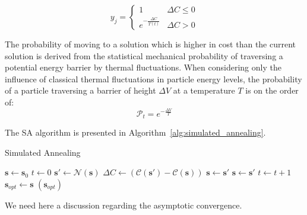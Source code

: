 \documentclass[11pt]{afthesis}
\begin{document}
	\begin{equation} 
	y_j = \begin{cases}
	1 &\Delta C   \leq 0 \\
	e^{-\frac{\Delta C}{T(t)}} & \Delta C > 0 
	\end{cases}
	\end{equation}

	
	The probability of moving to a solution which is higher in cost than the current solution is derived from the statistical mechanical probability of traversing a potential energy barrier by thermal fluctuations. When considering only the influence of classical thermal fluctuations in particle energy levels, the probability of a particle traversing a barrier of height \begin{math} \Delta V \end{math} at a temperature \begin{math} T \end{math} is on the order of: \begin{equation} 
	\mathcal{P}_t = e^{-\frac{\Delta V}{T}} 
	\label{eq:thermal_traversal_prob}
	\end{equation}
	
	 The SA algorithm is presented in Algorithm~\ref{alg:simulated_annealing}. 



	
	\begin{algorithm}
		\caption{Simulated Annealing}
		\label{alg:simulated_annealing}
		\begin{algorithmic}
			\STATE $\boldsymbol{s} \leftarrow \boldsymbol{s}_0$
			\STATE $t \leftarrow 0$
			\STATE $\boldsymbol{s}' \leftarrow \boldsymbol{\mathcal{N}}(\boldsymbol{s}) $
			\STATE $\Delta C \leftarrow (\mathcal{C}(\boldsymbol{s}')-\mathcal{C}(\boldsymbol{s}))$
			\STATE $\boldsymbol{s} \leftarrow \boldsymbol{s}'$
			\STATE $\boldsymbol{s} \leftarrow \boldsymbol{s}'$
			\ENDIF
			\STATE $t \leftarrow t+1$
			\ENDWHILE
			\STATE $\boldsymbol{s}_{opt} \leftarrow \boldsymbol{s}$
			\RETURN $(\boldsymbol{s}_{opt})$
		\end{algorithmic}
	\end{algorithm}
		
	We need here a discussion regarding the asymptotic convergence.
	
\end{document}
